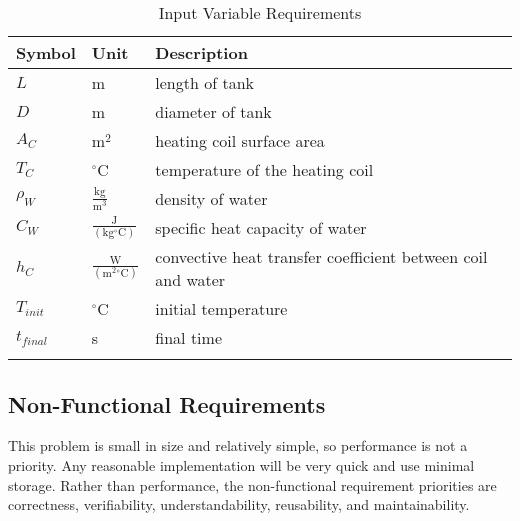 \documentclass[12pt]{article}
\begin{document}
\begin{longtabu}{l l X[l]}
\toprule
Symbol & Unit & Description
\\
\midrule
$L$ & m & length of tank
\\
$D$ & m & diameter of tank
\\
${A_{C}}$ & $\text{m}^{2}$ & heating coil surface area
\\
${T_{C}}$ & ${}^{\circ}$C & temperature of the heating coil
\\
${ρ_{W}}$ & $\frac{\text{kg}}{\text{m}^{3}}$ & density of water
\\
${C_{W}}$ & $\frac{\text{J}}{(\text{kg}{}^{\circ}\text{C})}$ & specific heat capacity of water
\\
${h_{C}}$ & $\frac{\text{W}}{(\text{m}^{2}{}^{\circ}\text{C})}$ & convective heat transfer coefficient between coil and water
\\
${T_{init}}$ & ${}^{\circ}$C & initial temperature
\\
${t_{final}}$ & s & final time
\\
\bottomrule
\caption{Input Variable Requirements}
\label{Table:Input-Variable-Requirements}
\end{longtabu}
\subsection{Non-Functional Requirements}
\label{Sec:NFRs}
This problem is small in size and relatively simple, so performance is not a priority. Any reasonable implementation will be very quick and use minimal storage. Rather than performance, the non-functional requirement priorities are correctness, verifiability, understandability, reusability, and maintainability.
\end{document}
